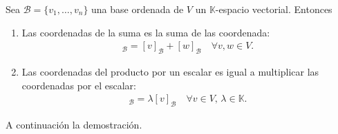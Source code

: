 \documentclass[handout]{beamer} %
\newcommand{\K}{\mathbb K}
\newcommand{\cB}{\mathcal{B}}
\begin{document}
        \begin{frame}
    
        \begin{proposicion}\label{vectorbase->lineal}
            Sea $\mathcal{B}=\{v_1,\ldots,v_n\}$ una base ordenada de $V$ un $\K$-espacio vectorial. Entonces\pause
            \begin{enumerate}
                \item\label{itm-coor-1}Las coordenadas de la suma es la suma de las coordenada:
                \begin{align*}
                [v+w]_\cB=[v]_\cB+[w]_\cB\quad\forall v,w\in V .
                \end{align*}\pause
                \item\label{itm-coor-2} Las coordenadas del producto por un escalar es igual a multiplicar las coordenadas por el escalar:
                \begin{align*}
                [\lambda v]_\cB=\lambda[v]_\cB\quad\forall v\in V,\,\lambda\in\K.
                \end{align*}
            \end{enumerate}
        \end{proposicion} 	
        \pause
        
        A continuación la demostración.
        
        \end{frame}
        
\end{document}
